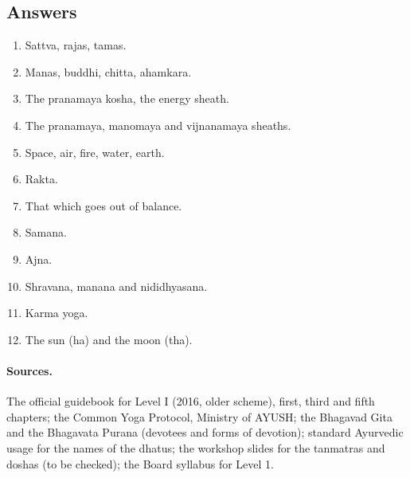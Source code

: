 \subsection*{Answers}
\begin{enumerate}
\item Sattva, rajas, tamas.
\item Manas, buddhi, chitta, ahamkara.
\item The pranamaya kosha, the energy sheath.
\item The pranamaya, manomaya and vijnanamaya sheaths.
\item Space, air, fire, water, earth.
\item Rakta.
\item That which goes out of balance.
\item Samana.
\item Ajna.
\item Shravana, manana and nididhyasana.
\item Karma yoga.
\item The sun (ha) and the moon (tha).
\end{enumerate}

\paragraph{Sources.} The official guidebook for Level I (2016, older scheme), first, third and fifth chapters; the Common Yoga Protocol, Ministry of AYUSH; the Bhagavad Gita and the Bhagavata Purana (devotees and forms of devotion); standard Ayurvedic usage for the names of the dhatus; the workshop slides for the tanmatras and doshas (to be checked); the Board syllabus for Level 1.
